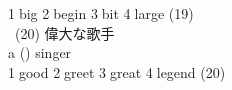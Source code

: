 \documentclass[uplatex]{jsarticle}
\begin{document}
\hspace{10mm}\textcircled{\normalsize1}big \textcircled{\normalsize2}begin \textcircled{\normalsize3}bit \textcircled{\normalsize4}large 
\hspace{\fill}(19)\underline{\hspace{35mm}}\\
\ (20) 偉大な歌手\\
\hspace{10mm}a (\hspace{10mm}) singer\\
\hspace{10mm}\textcircled{\normalsize1}good \textcircled{\normalsize2}greet \textcircled{\normalsize3}great \textcircled{\normalsize4}legend 
\hspace{\fill}(20)\underline{\hspace{35mm}}\\
% 
\end{document}
